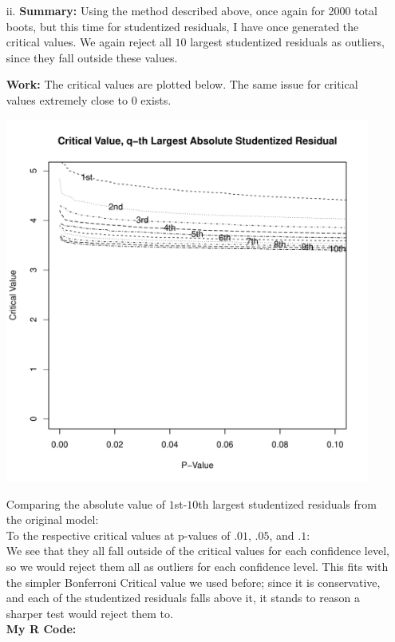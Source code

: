 \documentclass[11pt]{article}
\theoremstyle{definition}
\begin{document}
\begin{itemize}
\begin{itemize}
\begin{itemize}
                    \item[ii.]
                        {\bf Summary:} Using the method described above, once again for 2000 total boots, but this time for studentized residuals, I have once generated the critical values. We again reject all $10$ largest studentized residuals as outliers, since they fall outside these values. \par
                        {\bf Work:} The critical values are plotted below. The same issue for critical values extremely close to 0 exists.
                        \begin{center}
                            \includegraphics[width=12cm]{final/2bii_plot} 
                        \end{center}
                        Comparing the absolute value of $1$st-$10$th largest studentized residuals from the original model:\\ 
                         
                        To the respective critical values at p-values of $.01$, $.05$, and $.1$: \\
                         
                        We see that they all fall outside of the critical values for each confidence level, so we would reject them all as outliers for each confidence level. This fits with the simpler Bonferroni Critical value we used before; since it is conservative, and each of the studentized residuals falls above it, it stands to reason a sharper test would reject them to. \\
                        {\bf My R Code:}
                         


\end{itemize}
\end{itemize}
\end{itemize}
\end{document}

